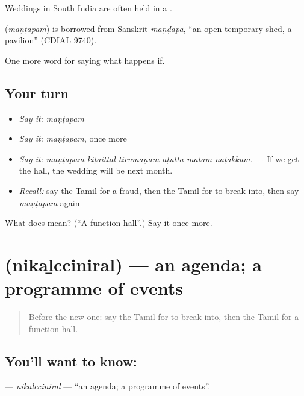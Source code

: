 Weddings in South India are often held in a  .

\begin{cousinweb}
\textbf{} (\emph{maṇṭapam}) is borrowed from Sanskrit \emph{maṇḍapa}, \textquotedblleft{}an open temporary shed, a pavilion\textquotedblright{} (CDIAL 9740).
\end{cousinweb}

\begin{grammarlens}[title={What you've built}]
One more word for saying what happens if.
\end{grammarlens}

\subsection*{Your turn}
\begin{itemize}
\raggedright
  \item \emph{Say it:} \emph{maṇṭapam}
  \item \emph{Say it:} \emph{maṇṭapam}, once more
  \item \emph{Say it:} \emph{maṇṭapam kiṭaittāl tirumaṇam aṭutta mātam naṭakkum.} — If we get the hall, the wedding will be next month.
  \item \emph{Recall:} say the Tamil for a fraud, then the Tamil for to break into, then say \emph{maṇṭapam} again
\end{itemize}

\begin{tcolorbox}[breakable,colback=teal!4,colframe=teal!35!black,title={Before you move on}]
What does  mean? (\textquotedblleft{}A function hall\textquotedblright{}.) Say it once more.
\end{tcolorbox}
\section[\texorpdfstring{\ta{நிகழ்ச்சிநிரல்} (nikaḻcciniral)}{நிகழ்ச்சிநிரல் (nikaḻcciniral)}]{ (nikaḻcciniral) — an agenda; a programme of events}

\label{lesson:TA-C549-nikalcciniral}



\begin{quote}
Before the new one: say the Tamil for to break into, then the Tamil for a function hall.
\end{quote}

\subsection*{You'll want to know: }
\textbf{} — \emph{nikaḻcciniral} — \textquotedblleft{}an agenda; a programme of events\textquotedblright{}.


